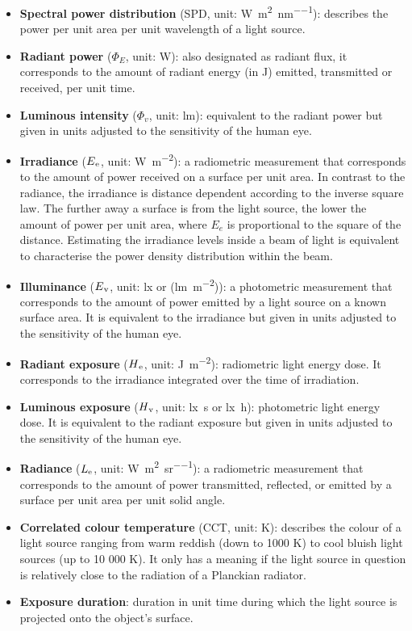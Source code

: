 \begin{itemize}
    \item \textbf{Spectral power distribution} (SPD, unit: \unit{\watt\per\square\metre\per\nm}): describes the power per unit area per unit wavelength of a light source.
    \item \textbf{Radiant power} ($\Phi_E$, unit: \unit{\watt}): also designated as radiant flux, it corresponds to the amount of radiant energy (in \unit{\joule}) emitted, transmitted or received, per unit time. 
    \item\textbf{Luminous intensity} ($\Phi_v$, unit: \unit{\lumen}): equivalent to the radiant power but given in units adjusted to the sensitivity of the human eye.
    \item \textbf{Irradiance} ($E\textsubscript{e}$, unit: \unit{\watt\per\square\metre}): a radiometric measurement that corresponds to the amount of power received on a surface per unit area. In contrast to the radiance, the irradiance is distance dependent according to the inverse square law. The further away a surface is from the light source, the lower the amount of power per unit area, where $E_e$ is proportional to the square of the distance. Estimating the irradiance levels inside a beam of light is equivalent to characterise the power density distribution within the beam.
    \item \textbf{Illuminance} ($E\textsubscript{v}$, unit: \unit{\lux} or (\unit{\lumen\per\square\metre})): a photometric measurement that corresponds to the amount of power emitted by a light source on a known surface area. It is equivalent to the irradiance but given in units adjusted to the sensitivity of the human eye.
    \item \textbf{Radiant exposure} ($H\textsubscript{e}$, unit: \unit{\joule\per\square\metre}): radiometric light energy dose. It corresponds to the irradiance integrated over the time of irradiation.
    \item \textbf{Luminous exposure} ($H\textsubscript{v}$, unit: \unit{\lux\second} or \unit{\lux\hour}): photometric light energy dose. It is equivalent to the radiant exposure but given in units adjusted to the sensitivity of the human eye. 
    \item \textbf{Radiance} ($L\textsubscript{e}$, unit: \unit{\watt\per\square\metre\per\steradian}): a radiometric measurement that corresponds to the amount of power transmitted, reflected, or emitted by a surface per unit area per unit solid angle.   
    \item \textbf{Correlated colour temperature} (CCT, unit: \unit{\kelvin}): describes the colour of a light source ranging from warm reddish (down to 1000 \unit{\kelvin}) to cool bluish light sources (up to 10 000 \unit{\kelvin}). It only has a meaning if the light source in question is relatively close to the radiation of a Planckian radiator.
    \item \textbf{Exposure duration}: duration in unit time during which the light source is projected onto the object’s surface.    
\end{itemize}

